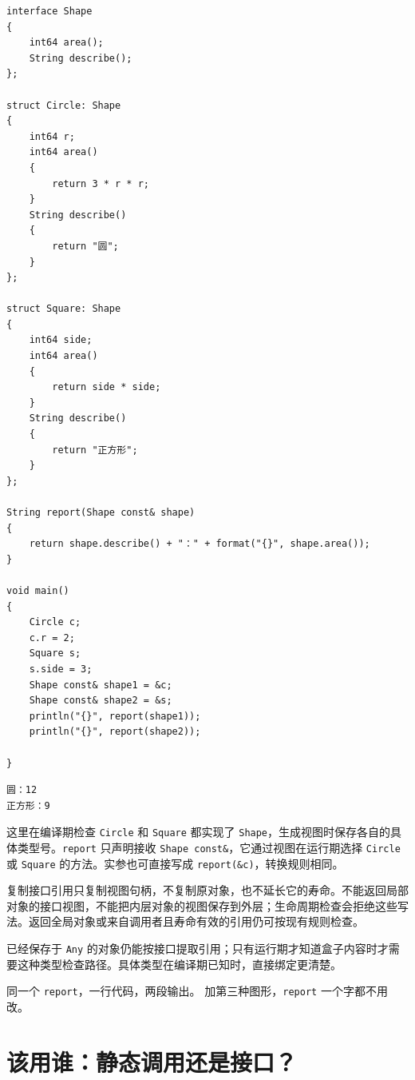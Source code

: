\par
\medskip
\begin{lstlisting}[style=chali]
interface Shape
{
    int64 area();
    String describe();
};

struct Circle: Shape
{
    int64 r;
    int64 area()
    {
        return 3 * r * r;
    }
    String describe()
    {
        return "圆";
    }
};

struct Square: Shape
{
    int64 side;
    int64 area()
    {
        return side * side;
    }
    String describe()
    {
        return "正方形";
    }
};

String report(Shape const& shape)
{
    return shape.describe() + "：" + format("{}", shape.area());
}

void main()
{
    Circle c;
    c.r = 2;
    Square s;
    s.side = 3;
    Shape const& shape1 = &c;
    Shape const& shape2 = &s;
    println("{}", report(shape1));
    println("{}", report(shape2));

}
\end{lstlisting}
\par
\medskip

\par
\medskip
\begin{lstlisting}[style=out]
圆：12
正方形：9
\end{lstlisting}
\par
\medskip

这里在编译期检查 \texttt{Circle} 和 \texttt{Square} 都实现了 \texttt{Shape}，生成视图时保存各自的具体类型号。\texttt{report} 只声明接收 \texttt{Shape const\&}，它通过视图在运行期选择 \texttt{Circle} 或 \texttt{Square} 的方法。实参也可直接写成 \texttt{report(\allowbreak{}\&c)\allowbreak{}}，转换规则相同。

复制接口引用只复制视图句柄，不复制原对象，也不延长它的寿命。不能返回局部对象的接口视图，不能把内层对象的视图保存到外层；生命周期检查会拒绝这些写法。返回全局对象或来自调用者且寿命有效的引用仍可按现有规则检查。

已经保存于 \texttt{Any} 的对象仍能按接口提取引用；只有运行期才知道盒子内容时才需要这种类型检查路径。具体类型在编译期已知时，直接绑定更清楚。

同一个 \texttt{report}，一行代码，两段输出。 加第三种图形，\texttt{report} 一个字都不用改。

\section{该用谁：静态调用还是接口？}

